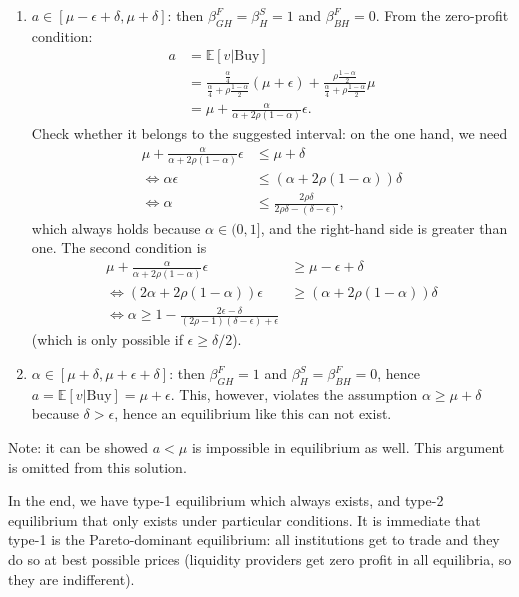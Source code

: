\begin{solution}
\begin{enumerate}
		\item $a \in [\mu - \epsilon + \delta, \mu + \delta]$: then $\beta^F_{GH} = \beta^S_H = 1$ and $\beta^F_{BH} = 0$. From the zero-profit condition:
		\begin{align*}
			a &= \mathbb{E}[v | \text{Buy}]
			\\
			&= \frac{\frac{\alpha}{4}}{\frac{\alpha}{4} + \rho \frac{1-\alpha}{2}} (\mu + \epsilon) 
			+ \frac{\rho \frac{1-\alpha}{2}}{\frac{\alpha}{4} + \rho \frac{1-\alpha}{2}} \mu
			\\
			&= \mu + \frac{\alpha}{\alpha + 2\rho (1-\alpha)} \epsilon.
		\end{align*}
		Check whether it belongs to the suggested interval: on the one hand, we need
		\begin{align*}
			\mu + \frac{\alpha}{\alpha + 2\rho (1-\alpha)} \epsilon &\leq \mu + \delta
			\\
			\iff
			\alpha \epsilon & \leq \left( \alpha + 2\rho (1-\alpha) \right) \delta
			\\
			\iff
			\alpha & \leq \frac{2\rho \delta}{2\rho \delta - (\delta - \epsilon)},
		\end{align*}
		which always holds because $\alpha \in (0,1]$, and the right-hand side is greater than one. The second condition is
		\begin{align*}
			\mu + \frac{\alpha}{\alpha + 2\rho (1-\alpha)} \epsilon & \geq \mu - \epsilon + \delta
			\\
			\iff
			(2\alpha + 2\rho (1-\alpha)) \epsilon & \geq (\alpha + 2\rho (1-\alpha)) \delta
			\\
			\iff
			\alpha \geq 1 - \frac{2 \epsilon - \delta}{(2\rho-1)(\delta-\epsilon) + \epsilon}
		\end{align*}
		(which is only possible if $\epsilon \geq \delta /2$).
		
		\item $\alpha \in [\mu + \delta, \mu + \epsilon + \delta]$: then $\beta^F_{GH} = 1$ and $\beta^S_H = \beta^F_{BH} = 0$, hence $a = \mathbb{E}[v | \text{Buy}] = \mu + \epsilon$. This, however, violates the assumption $\alpha \geq \mu + \delta$ because $\delta > \epsilon$, hence an equilibrium like this can not exist.
	\end{enumerate}
	
	Note: it can be showed $a < \mu$ is impossible in equilibrium as well. This argument is omitted from this solution.
	
	In the end, we have type-1 equilibrium which always exists, and type-2 equilibrium that only exists under particular conditions.
	It is immediate that type-1 is the Pareto-dominant equilibrium: all institutions get to trade and they do so at best possible prices (liquidity providers get zero profit in all equilibria, so they are indifferent).
	

\end{solution}
